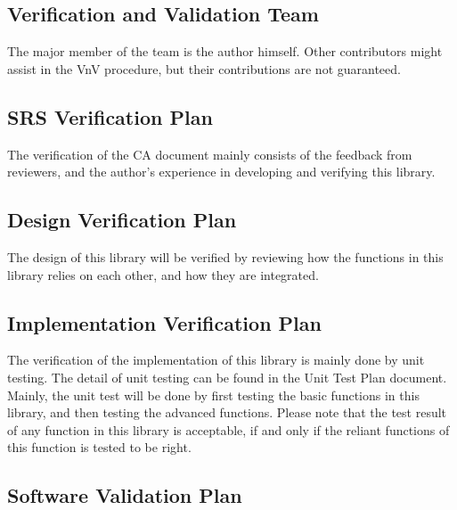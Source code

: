 \documentclass[12pt, titlepage]{article}
\begin{document}
\subsection{Verification and Validation Team}\label{sbsc:VnVTeam}

The major member of the team is the author himself. Other contributors might
assist in the VnV procedure, but their contributions are not
guaranteed. 

\subsection{SRS Verification Plan}
\label{sbsc:SRSVnVPlan}

The verification of the CA document mainly consists of the feedback from
reviewers, and the author's experience in developing and verifying this
library. 

\subsection{Design Verification Plan}
\label{sbsc:DesignVnVPlan}

The design of this library will be verified by reviewing how the functions in
this library relies on each other, and how they are integrated. 

\subsection{Implementation Verification Plan}
\label{sbsc:ImplementationVnVPlan}

The verification of the implementation of this library is mainly done by unit
testing. The detail of unit testing can be found in the Unit Test Plan
document. Mainly, the unit test will be done by first testing the basic
functions in this library, and then testing the advanced functions. Please note
that the test result of any function in this library is acceptable, if and only
if the reliant functions of this function is tested to be right.

\subsection{Software Validation Plan}\label{sbsc:SoftwareVnVPlan}
\end{document}
